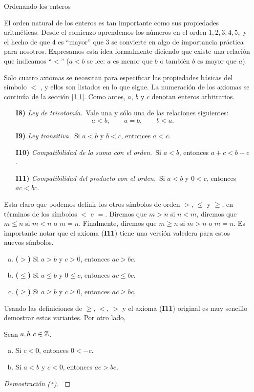 \begin{section}{Ordenando los enteros}\label{1.2}

El orden natural de los enteros es tan importante como sus
propiedades aritméticas. Desde el comienzo aprendemos los números
en el orden $1, 2, 3, 4, 5,$ y el hecho de que $4$ es ``mayor'' que $3$ se
convierte en algo de importancia práctica para nosotros.
Expresamos esta idea formalmente diciendo que existe una relación
que indicamos ``$<$'' ($a < b$ se lee: $a$ es menor que
$b$ o también $b$ es mayor que $a$). 

Solo cuatro axiomas se necesitan para especificar las propiedades básicas del símbolo $<$ , y ellos son listados en lo que sigue. La numeración de los
axiomas se continúa de la sección \ref{1.1}. Como antes, $a$, $b$ y $c$ denotan enteros arbitrarios.

\begin{enumerate}
\item[{\bf I8)}] {\em Ley de tricotomía.}\, Vale una y sólo una de las relaciones
siguientes:
$$
a<b, \qquad a = b, \qquad b < a.
$$
\item[{\bf I9)}] {\em Ley transitiva.}\, Si $a< b$ y $b < c$, entonces $a<c$.
\item[{\bf I10)}] {\em Compatibilidad de la suma con el orden.}\, Si $a < b$, entonces $a+c < b+c$. 
\item[{\bf I11)}] {\em Compatibilidad del producto con el orden.}\, Si $a< b$ y $0< c$, entonces $ac < bc$. 
\end{enumerate}


Esta claro que podemos definir los otros símbolos de orden $>$,
$\le$ y $\ge$, en términos de los símbolos $<$ e $=$. Diremos que $m>n$ si  $n<m$, diremos que $m \le n$ si $m<n$ o $m=n$. Finalmente, diremos que $m \ge n$ si $m > n$ o $m=n$.  Es importante notar que el  axioma ({\bf I11}) tiene una versión valedera para estos nuevos símbolos.
\begin{enumerate}[a)]
\item {\bf ($>$)} Si $a > b$ y $c>0$, entonces $ac > bc$.
\item {\bf ($\le$)} Si $a \le b$ y $0 \le c$, entonces $ac \le bc$.
\item {\bf ($\ge$)} Si $a\ge b$ y $c\ge 0$, entonces $ac \ge bc$.
\end{enumerate}
Usando las definiciones de $\ge$, $<$, $>$ y el axioma ({\bf I11}) original es muy sencillo demostrar estas variantes. Por otro lado,

\begin{proposicion}\label{prop-compatibilidad-negativa}
	Sean $a, b, c \in {\mathbb Z}$.  
	\begin{enumerate}[a)]
		\item Si $c < 0$, entonces $0 < -c$.
		\item Si $a< b$ y $c< 0$, entonces $ac > bc$. 
	\end{enumerate}
\end{proposicion}
\begin{proof}[Demostración (*)] {${}^{}$}
	

\end{proof}
\end{section}
